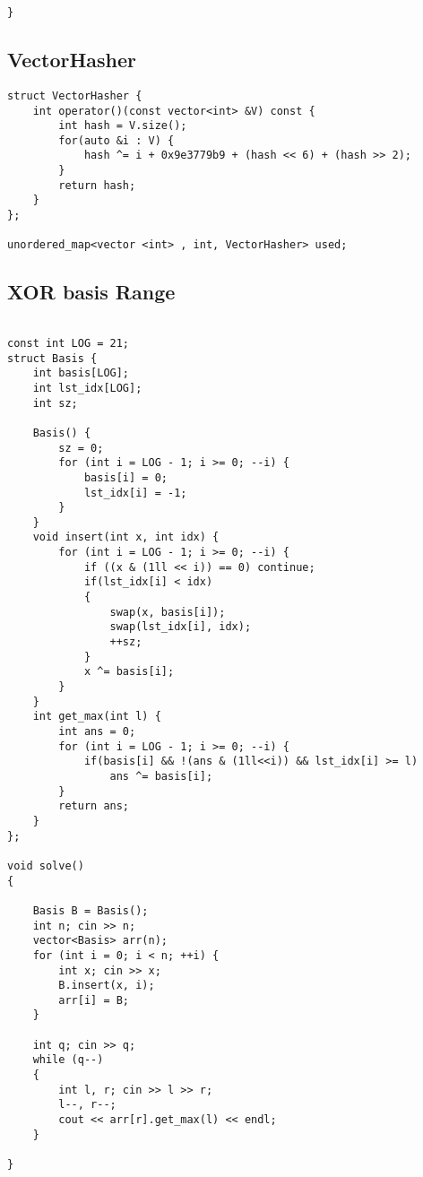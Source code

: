 {\begin{lstlisting}[style=cpp]
}
\end{lstlisting}

\subsection{VectorHasher}

\begin{lstlisting}[style=cpp]
struct VectorHasher {
    int operator()(const vector<int> &V) const {
        int hash = V.size();
        for(auto &i : V) {
            hash ^= i + 0x9e3779b9 + (hash << 6) + (hash >> 2);
        }
        return hash;
    }
};

unordered_map<vector <int> , int, VectorHasher> used;
\end{lstlisting}

\subsection{XOR basis Range}

\begin{lstlisting}[style=cpp]

const int LOG = 21;
struct Basis {
    int basis[LOG];
    int lst_idx[LOG];
    int sz;
 
    Basis() {
        sz = 0;
        for (int i = LOG - 1; i >= 0; --i) {
            basis[i] = 0;
            lst_idx[i] = -1;
        }
    }
    void insert(int x, int idx) {
        for (int i = LOG - 1; i >= 0; --i) {
            if ((x & (1ll << i)) == 0) continue;
            if(lst_idx[i] < idx)
            {
                swap(x, basis[i]);
                swap(lst_idx[i], idx);
                ++sz;
            }
            x ^= basis[i];
        }
    }
    int get_max(int l) {
        int ans = 0;
        for (int i = LOG - 1; i >= 0; --i) {
            if(basis[i] && !(ans & (1ll<<i)) && lst_idx[i] >= l)
                ans ^= basis[i];
        }
        return ans;
    }
};
 
void solve()
{
 
    Basis B = Basis();
    int n; cin >> n;
    vector<Basis> arr(n);
    for (int i = 0; i < n; ++i) {
        int x; cin >> x;
        B.insert(x, i);
        arr[i] = B;
    }
 
    int q; cin >> q;
    while (q--)
    {
        int l, r; cin >> l >> r;
        l--, r--;
        cout << arr[r].get_max(l) << endl;
    }
 
}
\end{lstlisting}

}
